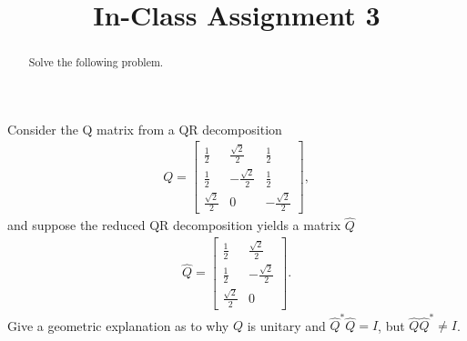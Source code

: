 \documentclass{ximera}
\begin{document}
    \title{In-Class Assignment 3}
    
    \begin{abstract} Solve the following problem.
    \end{abstract}
    \maketitle

\begin{exercise}
    Consider the Q matrix from a QR decomposition
    \begin{align*}
        Q = \begin{bmatrix}
            \frac12 & \frac{\sqrt2}2 & \frac12 
            \\[0.7em] 
            \frac12 & -\frac{\sqrt2}2 & \frac12\\[0.7em]
            \frac{\sqrt2}2 & 0 & -\frac{\sqrt{2}}2
        \end{bmatrix},
    \end{align*}
    and suppose the reduced QR decomposition yields a matrix $\hat{Q}$
    \begin{align*}
        \hat{Q} = \begin{bmatrix}
            \frac12 & \frac{\sqrt2}2 
            \\[0.7em] 
            \frac12 & -\frac{\sqrt2}2 \\[0.7em]
            \frac{\sqrt2}2 & 0
        \end{bmatrix}.
    \end{align*}
    Give a geometric explanation as to why $Q$ is unitary and $\hat{Q}^*\hat{Q} = I$, but  $\hat{Q}\hat{Q}^* \neq I$.
\end{exercise}
\end{document}
